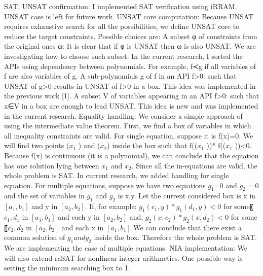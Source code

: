 \documentclass[12pt]{article}
\begin{document}
SAT, UNSAT confirmation: I implemented SAT verification using iRRAM. UNSAT case is left for future work.
UNSAT core computation: Because UNSAT requires exhaustive search for all the possibilities, we define UNSAT core to reduce the target constraints. Possible choices are:
A subset φ of constraints from the original ones ω: It is clear that if φ is UNSAT then ω is also UNSAT. We are investigating how to choose such subset. In the current research, I sorted the APIs using dependency between polynomials. For example, f≺g if all variables of f are also variables of g.
A sub-polynomials g of f in an API f>0: such that UNSAT of g>0 results in UNSAT of f>0 in a box. This idea was implemented in the previous work [1]. 
A subset V of variables appearing in an API f>0: such that x∈V in a box are enough to lead UNSAT. This idea is new and was implemented in the current research. 
Equality handling: We consider a simple approach of using the intermediate value theorem. First, we find a box of variables in which all inequality constraints are valid.
For single equation, suppose it is f(x)=0. We will find two points ($x_1$ ) and ($x_2$) inside the box such that f(($x_1$ ))* f(($x_1$ ))<0. Because f(x) is continuous (it is a polynomial), we can conclude that the equation has one solution lying between $x_1$ and $x_2$. Since all the in-equations are valid, the whole problem is SAT. In current research, we added handling for single equation. 
For multiple equations, suppose we have two equations $g_1$=0 and $g_2=0$ and the set of variables in $g_1$ and $g_2$ is {x,y}. Let the current considered box is x in $[a_1,b_1 ]$ and y in $[a_2,b_2 ]$. If, for example:
	$g_1 (c_1,y)*g_1 (d_1,y)<0$ for some〖$c_1,d_1$  in $[a_1,b_1 ]$ and each y in $[a_2,b_2 ]$ and, 
	$g_2 (x,c_2 )*g_2 (x,d_2 )<0$ for some〖$c_2,d_2$  in $[a_2,b_2 ]$ and each x in $[a_1,b_1 ]$
We can conclude that there exist a common solution of $g_1 and g_2$ inside the box. Therefore the whole problem is SAT. We are implementing the case of multiple equations.
	NIA implementation: We will also extend raSAT for nonlinear integer arithmetics. One possible way is setting the minimum searching box to 1. 
\end{document}
